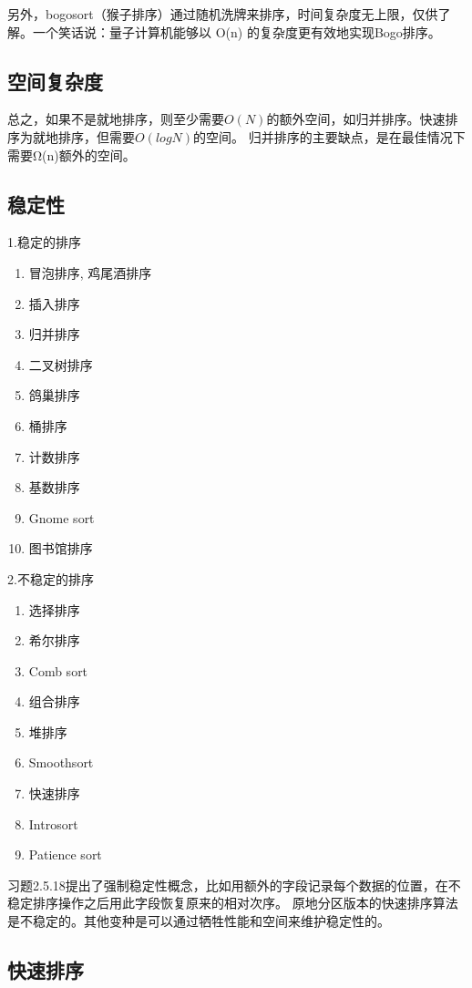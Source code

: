 另外，bogosort（猴子排序）通过随机洗牌来排序，时间复杂度无上限，仅供了解。一个笑话说：量子计算机能够以 O(n) 的复杂度更有效地实现Bogo排序。


\subsection{空间复杂度}
总之，如果不是就地排序，则至少需要$O(N)$的额外空间，如归并排序。快速排序为就地排序，但需要$O(logN)$的空间。
归并排序的主要缺点，是在最佳情况下需要Ω(n)额外的空间\cite{weijipedia}。

\subsection{稳定性}
\cite{weijipedia}
1.稳定的排序
\begin{enumerate}
	\item 冒泡排序, 鸡尾酒排序
	\item 插入排序
	\item 归并排序
	\item 二叉树排序
	\item 鸽巢排序
	\item 桶排序
	\item 计数排序
	\item 基数排序
	\item Gnome sort
	\item 图书馆排序
	\end{enumerate}

	2.不稳定的排序

	\begin{enumerate}
	\item 选择排序
	\item 希尔排序
	\item Comb sort
	\item 组合排序
	\item 堆排序
	\item Smoothsort
	\item 快速排序
	\item Introsort
	\item Patience sort
    \end{enumerate}

\cite{sedgewick}习题2.5.18提出了强制稳定性概念，比如用额外的字段记录每个数据的位置，在不稳定排序操作之后用此字段恢复原来的相对次序。
原地分区版本的快速排序算法是不稳定的。其他变种是可以通过牺牲性能和空间来维护稳定性的\cite{weijipedia}。

\subsection{快速排序}
\label{summary:quicksort}

